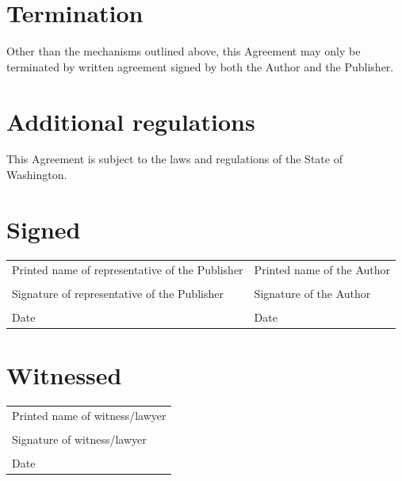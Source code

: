 \documentclass[12pt,letterpaper]{article}
\begin{document}
\section{Termination}

Other than the mechanisms outlined above, this Agreement may only be terminated by written agreement signed by both the Author and the Publisher.

\section{Additional regulations}

This Agreement is subject to the laws and regulations of the State of Washington.

\newpage

\thispagestyle{final}

\section*{Signed}

\begin{tabular}{p{3in} | p{3in}}
    \vspace{0.5in} & \\ \hline
    Printed name of representative of the Publisher & Printed name of the Author \\
    \vspace{0.5in} & \\ \hline
    Signature of representative of the Publisher & Signature of the Author \\
    \vspace{0.5in} & \\ \hline
    Date & Date \\
\end{tabular}

\section*{Witnessed}

\begin{tabular}{l}
    \vspace{0.5in} \\ \hline
    Printed name of witness/lawyer \\
    \vspace{0.5in} \\ \hline
    Signature of witness/lawyer \\
    \vspace{0.5in} \\ \hline
    Date \\
\end{tabular}
\end{document}
